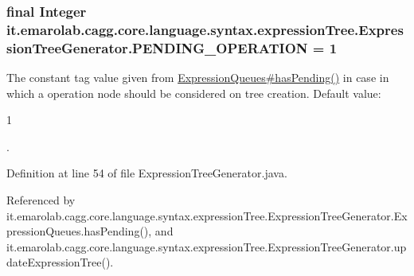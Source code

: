 \hypertarget{classit_1_1emarolab_1_1cagg_1_1core_1_1language_1_1syntax_1_1expressionTree_1_1ExpressionTreeGenerator_a01b70c565663efa0dec9c2ea700352f0}{
\subsubsection[{P\-E\-N\-D\-I\-N\-G\-\_\-\-O\-P\-E\-R\-A\-T\-I\-O\-N}]{\setlength{\rightskip}{0pt plus 5cm}final Integer it.\-emarolab.\-cagg.\-core.\-language.\-syntax.\-expression\-Tree.\-Expression\-Tree\-Generator.\-P\-E\-N\-D\-I\-N\-G\-\_\-\-O\-P\-E\-R\-A\-T\-I\-O\-N = 1\hspace{0.3cm}{\ttfamily [static]}}}\label{classit_1_1emarolab_1_1cagg_1_1core_1_1language_1_1syntax_1_1expressionTree_1_1ExpressionTreeGenerator_a01b70c565663efa0dec9c2ea700352f0}
The constant tag value given from \hyperlink{classit_1_1emarolab_1_1cagg_1_1core_1_1language_1_1syntax_1_1expressionTree_1_1ExpressionTreeGenerator_1_1ExpressionQueues_a3e49595a6682e2ca900f3813c126483d}{Expression\-Queues\#has\-Pending()} in case in which a operation node should be considered on tree creation. Default value\-:
\begin{DoxyCode}
1 
\end{DoxyCode}
 . 

Definition at line 54 of file Expression\-Tree\-Generator.\-java.



Referenced by it.\-emarolab.\-cagg.\-core.\-language.\-syntax.\-expression\-Tree.\-Expression\-Tree\-Generator.\-Expression\-Queues.\-has\-Pending(), and it.\-emarolab.\-cagg.\-core.\-language.\-syntax.\-expression\-Tree.\-Expression\-Tree\-Generator.\-update\-Expression\-Tree().

